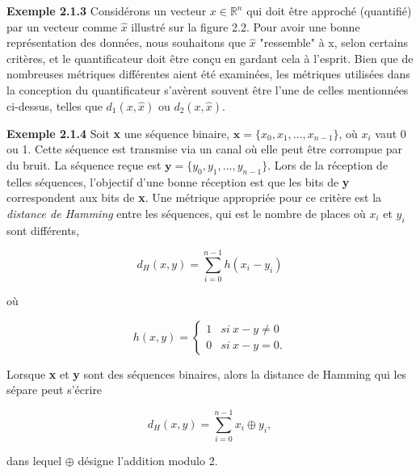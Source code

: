 \documentclass[11pt,twoside,a4paper]{article}
\begin{document}
\textbf{Exemple 2.1.3} Considérons un vecteur $x \in \mathbb{R}^n$ qui doit être approché (quantifié) par un vecteur comme $\hat{x}$ illustré sur la figure 2.2. 
Pour avoir une bonne représentation des données, nous souhaitons que $\hat{x}$ "ressemble" à x, selon certains critères, et le quantificateur doit être conçu en gardant cela à l'esprit. 
Bien que de nombreuses métriques différentes aient été examinées, les métriques utilisées dans la conception du quantificateur s'avèrent souvent être l'une de celles mentionnées 
ci-dessus, telles que $d_1(x, \hat{x})$ ou $d_2(x, \hat{x})$.


\textbf{Exemple 2.1.4} Soit \textbf{x} une séquence binaire, $\textbf{x} = \{x_0, x_1,...,x_{n-1}\}$, où $x_i$ vaut 0 ou 1. Cette séquence est transmise via un canal où elle peut être 
corrompue par du bruit. La séquence reçue est $\textbf{y} = \{y_0, y_1,...,y_{n-1}\}$. Lors de la réception de telles séquences, l'objectif d'une bonne réception est que les bits de \textbf{y}
correspondent aux bits de \textbf{x}. Une métrique appropriée pour ce critère est la \textit{distance de Hamming} entre les séquences, qui est le nombre de places où $x_i$ et $y_i$ sont différents,

\begin{equation*}
  d_H(x, y) = \sum_{i=0}^{n-1} h(x_i - y_i)
\end{equation*}

où

\begin{equation*}
  h(x, y) = \begin{cases} 1 & si \ x - y \neq 0 \\
    0 & si \ x - y = 0.
        \end{cases}
\end{equation*}

Lorsque \textbf{x} et \textbf{y} sont des séquences binaires, alors la distance de Hamming qui les sépare peut s'écrire

\begin{equation*}
  d_H(x, y) = \sum_{i=0}^{n-1} x_i \oplus y_i ,
\end{equation*}

dans lequel $\oplus$ désigne l'addition modulo 2.

\end{document}
